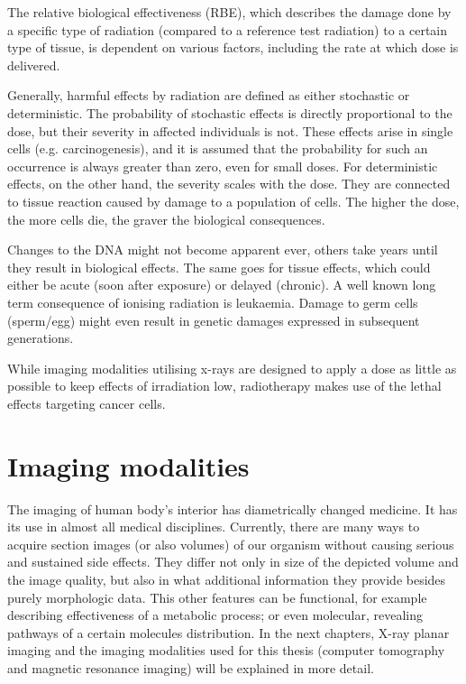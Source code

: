 The relative biological effectiveness (RBE), which describes the damage done by a specific type of radiation (compared to a reference test radiation) to a certain type of tissue, is dependent on various factors, including the rate at which dose is delivered.

Generally, harmful effects by radiation are defined as either stochastic or deterministic.
The probability of stochastic effects is directly proportional to the dose, but their severity in affected individuals is not.
These effects arise in single cells (e.g. carcinogenesis), and it is assumed that the probability for such an occurrence is always greater than zero, even for small doses.
For deterministic effects, on the other hand, the severity scales with the dose.
They are connected to tissue reaction caused by damage to a population of cells.
The higher the dose, the more cells die, the graver the biological consequences.

Changes to the DNA might not become apparent ever, others take years until they result in biological effects.
The same goes for tissue effects, which could either be acute (soon after exposure) or delayed (chronic).
A well known long term consequence of ionising radiation is leukaemia.
Damage to germ cells (sperm/egg) might even result in genetic damages expressed in subsequent generations.



While imaging modalities utilising x-rays are designed to apply a dose as little as possible to keep effects of irradiation low, radiotherapy makes use of the lethal effects targeting cancer cells. \cite{Podgorsak, Maidment2014}

\section{Imaging modalities}

The imaging of human body's interior has diametrically changed medicine.
It has its use in almost all medical disciplines.
Currently, there are many ways to acquire section images (or also volumes) of our organism without causing serious and sustained side effects.
They differ not only in size of the depicted volume and the image quality, but also in what additional information they provide besides purely morphologic data.
This other features can be functional, for example describing effectiveness of a metabolic process; or even molecular, revealing pathways of a certain molecules distribution.
In the next chapters, X-ray planar imaging and the imaging modalities used for this thesis (computer tomography and magnetic resonance imaging) will be explained in more detail.


